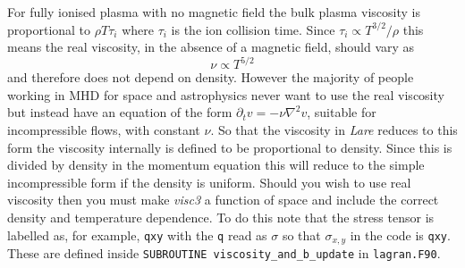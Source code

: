 \documentclass[11pt]{article}
\begin{document}
For fully ionised plasma with no magnetic field the bulk plasma viscosity is proportional to $\rho T \tau_i$ \cite{nrl} where $\tau_i$ is the ion collision time. Since $\tau_i \propto T^{3/2}/\rho$ this means the real viscosity, in the absence of a magnetic field, should vary as
\begin{displaymath}
  \nu \propto T^{5/2}
\end{displaymath}
and therefore does not depend on density. However the majority of people working in MHD for space and astrophysics never want to use the real viscosity but instead have an equation of the form $\partial_t v = - \nu \nabla^2 v$, suitable for incompressible flows, with constant $\nu$. So that the viscosity in {\it Lare} reduces to this form the viscosity internally is defined to be proportional to density. Since this is divided by density in the momentum equation this will reduce to the simple incompressible form if the density is uniform. Should you wish to use real viscosity then you must make {\it visc3} a function of space and include the correct density and temperature dependence. To do this note that the stress tensor is labelled as, for example, \texttt{qxy} with the \texttt{q} read as $\sigma$ so that $\sigma_{x,y}$ in the code is \texttt{qxy}. These are defined inside \texttt{SUBROUTINE viscosity\_and\_b\_update} in \texttt{lagran.F90}.
\end{document}
